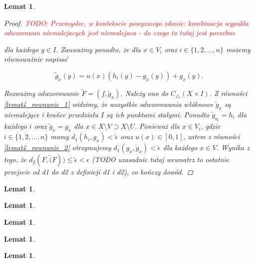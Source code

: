\documentclass[licencjacka]{pwr_wmat_praca_dyplomowa}
\theoremstyle{plain}
\numberwithin{theorem}{chapter}
\newtheorem{lemma}[theorem]{Lemat}
\theoremstyle{definition}
\numberwithin{theorem}{chapter}
\begin{document}
\begin{lemma}
\begin{proof}
\textcolor{red}{TODO: Przemyslec, w kontekscie powyzszego zdanie: kombinacja wypukla odwzorowan niemalejacych jest niemalejaca - do czego to tutaj jest porzebne}

dla każdego $y \in I$. Zauważmy ponadto, że dla $x \in V_i$ oraz $i \in \{1,2,\ldots,n\}$ możemy równoważnie napisać

\begin{equation} \label{lemat4_rownanie_2}
\widetilde{g}_x(y) = u(x)(h_i(y) - g_x(y)) + g_x(y).
\end{equation}

Rozważmy odwzorowanie $\widetilde{F} = (f, \widetilde{g}_x)$. Należy ono do $C_\triangle(X \times I)$. Z równości \ref{lemat4_rownanie_1} widzimy, że wszystkie odwzorowania włóknowe $\widetilde{g}_x$ są niemalejące i krańce przedziału $I$ są ich punktami stałymi. Ponadto $\widetilde{g}_{a_i} = h_i$ dla każdego $i$ oraz $\widetilde{g}_x = g_x$ dla $x \in X \setminus V \supset X \setminus U$. Ponieważ dla $x \in V_i$, gdzie $i \in \{1,2,\ldots,n\}$ mamy $d_1(h_i, g_x) < \widetilde{\epsilon}$ oraz $u(x) \in [0,1]$, zatem z równości \ref{lemat4_rownanie_2} otrzymujemy $d_1(g_x, \widetilde{g}_x) < \widetilde{\epsilon}$ dla każdego $x \in V$. Wynika z tego, że $d_2(F, \widetilde(F)) \leq \widetilde{\epsilon} < \epsilon$ (TODO uzasadnic tutaj wewnatrz to ostatnie przejscie od d1 do d2 z definicji d1 i d2), co kończy dowód.

\end{proof}



\end{lemma}

\begin{lemma}
\label{przeliczalny_przekroj_gestych_jest_rezydualny} 
\end{lemma}

\begin{lemma}
\label{nadzbior_rezydualnego_jest_rezydualny}
\end{lemma}

\begin{lemma}
\label{obraz_x0_razy_ab_przez_iterate_G_rowna_sie_x0y0}
\end{lemma}

\begin{lemma}
\label{obraz_przez_iterate_kazdego_dostatecznie_bliskiego_G_zawiera_sie_w_x0_razy_ab}
\end{lemma}

\begin{lemma}
\label{na_mocy_lematu_4_mozemy_dostac_odwzorowanie_H_z_wloknami_scisle_rosnacymi}
\end{lemma}
\end{document}
